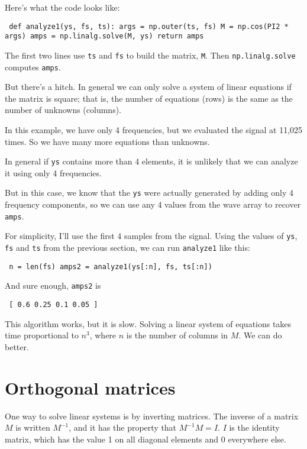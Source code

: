 \documentclass[12pt]{book} \usepackage[width=5.5in,height=8.5in, hmarginratio=3:2,vmarginratio=1:1]{geometry}
\begin{document}
Here's what the code looks like: 

\begin{verbatim} def analyze1(ys, fs, ts): args = np.outer(ts, fs) M = np.cos(PI2 * args) amps = np.linalg.solve(M, ys) return amps \end{verbatim} 

The first two lines use {\tt ts} and {\tt fs} to build the matrix, {\tt M}. Then {\tt np.linalg.solve} computes {\tt amps}. 

But there's a hitch. In general we can only solve a system of linear equations if the matrix is square; that is, the number of equations (rows) is the same as the number of unknowns (columns). 

In this example, we have only 4 frequencies, but we evaluated the signal at 11,025 times. So we have many more equations than unknowns. 

In general if {\tt ys} contains more than 4 elements, it is unlikely that we can analyze it using only 4 frequencies. 

But in this case, we know that the {\tt ys} were actually generated by adding only 4 frequency components, so we can use any 4 values from the wave array to recover {\tt amps}. 

For simplicity, I'll use the first 4 samples from the signal. Using the values of {\tt ys}, {\tt fs} and {\tt ts} from the previous section, we can run {\tt analyze1} like this: 

\begin{verbatim} n = len(fs) amps2 = analyze1(ys[:n], fs, ts[:n]) \end{verbatim} 

And sure enough, {\tt amps2} is 

\begin{verbatim} [ 0.6 0.25 0.1 0.05 ] \end{verbatim} 

This algorithm works, but it is slow. Solving a linear system of equations takes time proportional to $n^3$, where $n$ is the number of columns in $M$. We can do better. 

\section{Orthogonal matrices} 

One way to solve linear systems is by inverting matrices. The inverse of a matrix $M$ is written $M^{-1}$, and it has the property that $M^{-1}M = I$. $I$ is the identity matrix, which has the value 1 on all diagonal elements and 0 everywhere else. 
\end{document}
